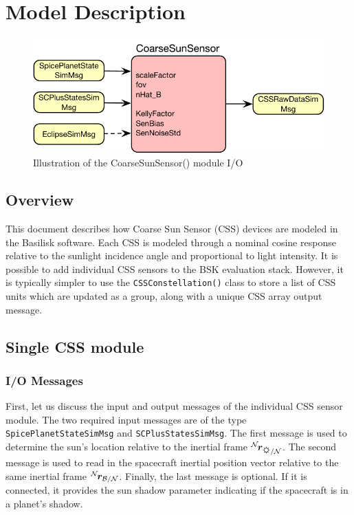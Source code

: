 
\section{Model Description}

\begin{figure}[htb]
	\centerline{
		\includegraphics[]{Figures/moduleDiagram}
	}
	\caption{Illustration of the CoarseSunSensor() module I/O}
	\label{fig:moduleDiagram}
\end{figure}
\subsection{Overview}
This document describes how Coarse Sun Sensor (CSS) devices are modeled in the Basilisk software.  Each CSS is modeled through a nominal cosine response relative to the sunlight incidence angle and proportional to light intensity.  It is possible to add individual CSS sensors to the BSK evaluation stack.  However, it is typically simpler to use the {\tt CSSConstellation()} class to store a list of CSS units which are updated as a group, along with a unique CSS array output message.

\subsection{Single CSS module}
\subsubsection{I/O Messages}
First, let us discuss the input and output messages of the individual CSS sensor module.  The two required input messages are of the type {\tt SpicePlanetStateSimMsg} and {\tt SCPlusStatesSimMsg}.  The first message is used to determine the sun's location relative to the inertial frame $\leftexp{N}{\bm r}_{\sun/\mathcal{N}}$.  The second message is used to read in the spacecraft inertial position vector relative to the same inertial frame $\leftexp{N}{\bm r}_{\cal B/N}$.  Finally, the last message is optional.  If it is connected, it provides the sun shadow parameter indicating if the spacecraft is in a planet's shadow.  

